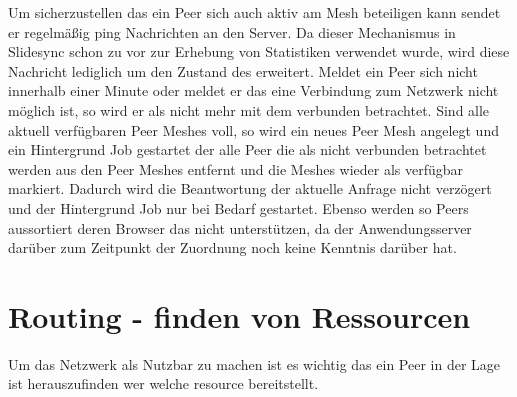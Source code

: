 Um sicherzustellen das ein Peer sich auch aktiv am Mesh beteiligen kann sendet er regelmäßig ping Nachrichten an den Server. Da dieser Mechanismus in Slidesync schon zu vor zur Erhebung von Statistiken verwendet wurde, wird diese Nachricht lediglich um den Zustand des \cdns erweitert. Meldet ein Peer sich nicht innerhalb einer Minute oder meldet er das eine Verbindung zum \pTp Netzwerk nicht möglich ist, so wird er als nicht mehr mit dem \pTp \cdn verbunden betrachtet. Sind alle aktuell verfügbaren Peer Meshes voll, so wird ein neues Peer Mesh angelegt und ein Hintergrund Job gestartet der alle Peer die als nicht verbunden betrachtet werden aus den Peer Meshes entfernt und die Meshes wieder als verfügbar markiert. Dadurch wird die Beantwortung der aktuelle Anfrage nicht verzögert und der Hintergrund Job nur bei Bedarf gestartet. Ebenso werden so Peers aussortiert deren Browser das \pTp \cdn nicht unterstützen, da der Anwendungsserver darüber zum Zeitpunkt der Zuordnung noch keine Kenntnis darüber hat.
%
%



\section{Routing - finden von Ressourcen}

Um das \pTp Netzwerk als \cdn Nutzbar zu machen ist es wichtig das ein Peer in der Lage ist herauszufinden wer welche resource bereitstellt.

%

